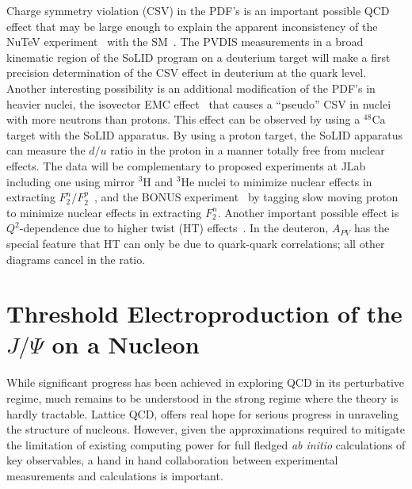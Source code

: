 \documentclass[12pt]{article}
\begin{document}
Charge symmetry violation (CSV) in the PDF's is an important possible QCD effect that may be large enough to explain the apparent inconsistency of the NuTeV experiment~\cite{Zeller:2001hh} with the SM~\cite{Londergan:2003ij,Londergan:2009kj}. The PVDIS measurements in a broad kinematic region of the SoLID program on a deuterium target will make a first precision determination of the CSV effect in deuterium at the quark level.
Another interesting possibility is an additional modification of the PDF's in heavier nuclei, the 
isovector EMC effect~\cite{Cloet:2012td}  that causes a ``pseudo'' CSV in nuclei with more neutrons than protons.  This effect can be observed by using a $^{48}$Ca target with the SoLID apparatus.
By using a proton target, the SoLID apparatus can measure the $d/u$ ratio in the proton in a manner totally free from nuclear effects.  The data will be complementary to proposed 
experiments at JLab including 
one using mirror $^3$H and $^3$He nuclei to minimize nuclear effects in extracting ${F^n_2}/{F^p_2}$~\cite{Arrington:2011qt}, and the BONUS 
experiment~\cite{Baillie:2011za} by tagging slow moving proton to minimize nuclear effects in extracting $F^n_2$.  Another important possible effect is
$Q^2$-dependence due to higher twist (HT) effects~\cite{Mantry:2010ki}.  In the deuteron, $A_{PV}$
has the special feature that HT can only be due to quark-quark correlations; all other diagrams cancel in the ratio.



\section{ Threshold Electroproduction of the $J/\Psi$ on a Nucleon}
While significant progress has been achieved in exploring QCD in its perturbative regime, much remains to be understood in the strong regime where the theory is hardly tractable. Lattice QCD, offers real hope for serious  progress in unraveling the structure of nucleons. However, given the approximations required to mitigate the limitation of existing computing power for full fledged {\it ab initio} calculations of key observables, a hand in hand collaboration between experimental measurements and calculations is important. 
\end{document}

